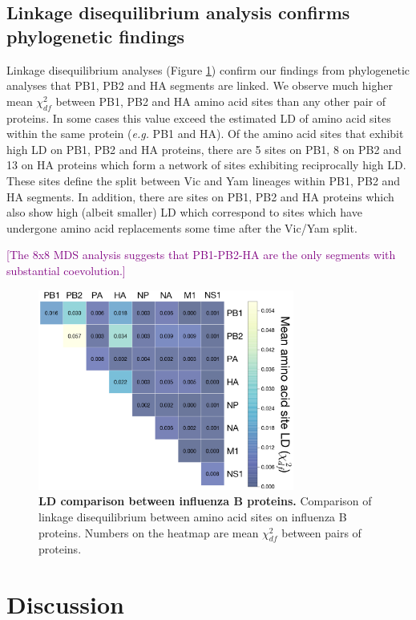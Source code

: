 \documentclass[11pt,oneside,letterpaper]{article}
\def\tbc#1{\textcolor{purple}{[#1]}}
\begin{document}
\subsection*{Linkage disequilibrium analysis confirms phylogenetic findings}
Linkage disequilibrium analyses (Figure \ref{segmentLD}) confirm our findings from phylogenetic analyses that PB1, PB2 and HA segments are linked.
We observe much higher mean $\chi^{2}_{df}$ between PB1, PB2 and HA amino acid sites than any other pair of proteins.
In some cases this value exceed the estimated LD of amino acid sites within the same protein (\textit{e.g.} PB1 and HA).
Of the amino acid sites that exhibit high LD on PB1, PB2 and HA proteins, there are 5 sites on PB1, 8 on PB2 and 13 on HA proteins which form a network of sites exhibiting reciprocally high LD.
These sites define the split between Vic and Yam lineages within PB1, PB2 and HA segments.
In addition, there are sites on PB1, PB2 and HA proteins which also show high (albeit smaller) LD which correspond to sites which have undergone amino acid replacements some time after the Vic/Yam split.


\tbc{The 8x8 MDS analysis suggests that PB1-PB2-HA are the only segments with substantial coevolution.}


\begin{figure}[h]
	\centering	
	\includegraphics[width=0.75\textwidth]	{figures/InfB_segmentLD.png}
	\caption{\textbf{LD comparison between influenza B proteins.}
Comparison of linkage disequilibrium between amino acid sites on influenza B proteins.
Numbers on the heatmap are mean $\chi^{2}_{df}$ between pairs of proteins.}
	\label{segmentLD}
\end{figure}

\section*{Discussion}
\end{document}
